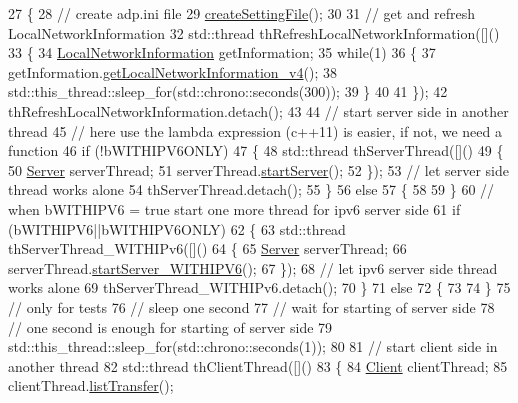 \begin{DoxyCode}
27 \{
28     \textcolor{comment}{// create adp.ini file}
29     \hyperlink{classControlCenter_a02dc6302f909e477aabc100af4a6cbe6}{createSettingFile}();
30 
31     \textcolor{comment}{// get and refresh LocalNetworkInformation}
32     std::thread thRefreshLocalNetworkInformation([]()
33     \{
34         \hyperlink{classLocalNetworkInformation}{LocalNetworkInformation} getInformation;
35         \textcolor{keywordflow}{while}(1)
36         \{
37             getInformation.\hyperlink{classLocalNetworkInformation_a891ef0a500a2b652e842fa067c751782}{getLocalNetworkInformation\_v4}();
38             std::this\_thread::sleep\_for(std::chrono::seconds(300));
39         \}
40 
41     \});
42     thRefreshLocalNetworkInformation.detach();
43 
44     \textcolor{comment}{// start server side in another thread}
45     \textcolor{comment}{// here use the lambda expression (c++11) is easier, if not, we need a function}
46     \textcolor{keywordflow}{if} (!bWITHIPV6ONLY)
47     \{
48         std::thread thServerThread([]()
49         \{
50             \hyperlink{classServer}{Server} serverThread;
51             serverThread.\hyperlink{classServer_a00509bf6473b95160150d4e28b072968}{startServer}();
52         \});
53         \textcolor{comment}{// let server side thread works alone}
54         thServerThread.detach();
55     \}
56     \textcolor{keywordflow}{else}
57     \{
58 
59     \}
60     \textcolor{comment}{// when bWITHIPV6 = true start one more thread for ipv6 server side}
61     \textcolor{keywordflow}{if} (bWITHIPV6||bWITHIPV6ONLY)
62     \{
63         std::thread thServerThread\_WITHIPv6([]()
64         \{
65             \hyperlink{classServer}{Server} serverThread;
66             serverThread.\hyperlink{classServer_a660e72a3e489abde31f99691be7156f2}{startServer\_WITHIPV6}();
67         \});
68         \textcolor{comment}{// let ipv6 server side thread works alone}
69         thServerThread\_WITHIPv6.detach();
70     \}
71     \textcolor{keywordflow}{else}
72     \{
73 
74     \}
75     \textcolor{comment}{// only for tests}
76     \textcolor{comment}{// sleep one second}
77     \textcolor{comment}{// wait for starting of server side}
78     \textcolor{comment}{// one second is enough for starting of server side}
79     std::this\_thread::sleep\_for(std::chrono::seconds(1));
80 
81     \textcolor{comment}{// start client side in another thread}
82     std::thread thClientThread([]()
83     \{
84         \hyperlink{classClient}{Client} clientThread;
85         clientThread.\hyperlink{classClient_a1f385d68275ac367f9d2a868904fd7f6}{listTransfer}();

\end{DoxyCode}
